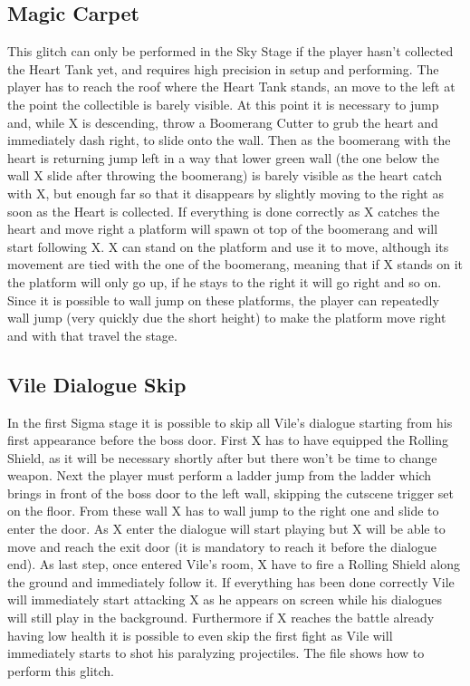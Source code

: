 \subsection{Magic Carpet}
This glitch can only be performed in the Sky Stage if the player hasn't collected the Heart Tank yet, and requires high precision in setup and performing. The player has to reach the roof where the Heart Tank stands, an move to the left at the point the collectible is barely visible. At this point it is necessary to jump and, while X is descending, throw a Boomerang Cutter to grub the heart and immediately dash right, to slide onto the wall. Then as the boomerang with the heart is returning jump left in a way that lower green wall (the one below the wall X slide after throwing the boomerang) is barely visible as the heart catch with X, but enough far so that it disappears by slightly moving to the right as soon as the Heart is collected. If everything is done correctly as X catches the heart and move right a platform will spawn ot top of the boomerang and will start following X. X can stand on the platform and use it to move, although its movement are tied with the one of the boomerang, meaning that if X stands on it the platform will only go up, if he stays to the right it will go right and so on. Since it is possible to wall jump on these platforms, the player can repeatedly wall jump (very quickly due the short height) to make the platform move right and with that travel the stage.

\subsection{Vile Dialogue Skip}
In the first Sigma stage it is possible to skip all Vile's dialogue starting from his first appearance before the boss door. First X has to have equipped the Rolling Shield, as it will be necessary shortly after but there won't be time to change weapon. Next the player must perform a ladder jump from the ladder which brings in front of the boss door to the left wall, skipping the cutscene trigger set on the floor. From these wall X has to wall jump to the right one and slide to enter the door. As X enter the dialogue will start playing but X will be able to move and reach the exit door (it is mandatory to reach it before the dialogue end). As last step, once entered Vile's room, X have to fire a Rolling Shield along the ground and immediately follow it. If everything has been done correctly Vile will immediately start attacking X as he appears on screen while his dialogues will still play in the background. Furthermore if X reaches the battle already having low health it is possible to even skip the first fight as Vile will immediately starts to shot his paralyzing projectiles. The file  shows how to perform this glitch.

